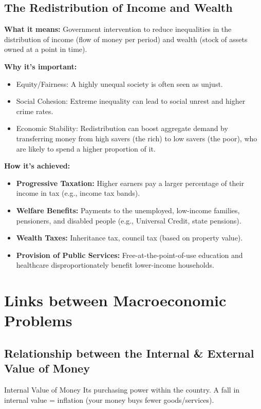 \documentclass[11pt, a4paper, twoside]{book}
\begin{document}
\subsection{The Redistribution of Income and Wealth}

\textbf{What it means:} Government intervention to reduce inequalities in the distribution of income (flow of money per period) and wealth (stock of assets owned at a point in time).

\textbf{Why it's important:}
\begin{itemize}
  \item Equity/Fairness: A highly unequal society is often seen as unjust.
  \item Social Cohesion: Extreme inequality can lead to social unrest and higher crime rates.
  \item Economic Stability: Redistribution can boost aggregate demand by transferring money from high savers (the rich) to low savers (the poor), who are likely to spend a higher proportion of it.
\end{itemize}

\textbf{How it's achieved:}
\begin{itemize}
  \item \textbf{Progressive Taxation:} Higher earners pay a larger percentage of their income in tax (e.g., income tax bands).
  \item \textbf{Welfare Benefits:} Payments to the unemployed, low-income families, pensioners, and disabled people (e.g., Universal Credit, state pensions).
  \item \textbf{Wealth Taxes:} Inheritance tax, council tax (based on property value).
  \item \textbf{Provision of Public Services:} Free-at-the-point-of-use education and healthcare disproportionately benefit lower-income households.
\end{itemize}

\section{Links between Macroeconomic Problems}

\subsection{Relationship between the Internal \& External Value of Money}

\begin{keyterm}{Internal Value of Money}
Its purchasing power within the country. A fall in internal value = inflation (your money buys fewer goods/services).
\end{keyterm}
\end{document}
